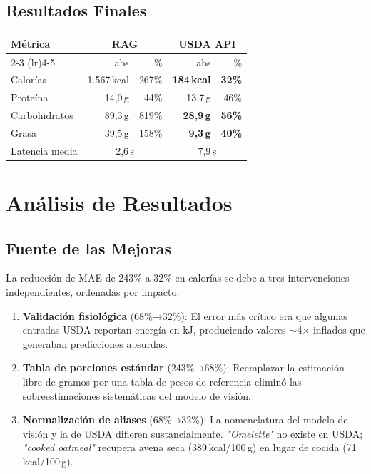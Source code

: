 \documentclass[10pt,a4paper]{article}
\begin{document}
\subsection{Resultados Finales}

\begin{center}
\begin{tabular}{lrrrr}
\toprule
\textbf{Métrica} & \multicolumn{2}{c}{\textbf{RAG}} & \multicolumn{2}{c}{\textbf{USDA API}} \\
\cmidrule(lr){2-3} \cmidrule(lr){4-5}
 & abs & \% & abs & \% \\
\midrule
Calorías   & 1.567\,kcal & 267\% & \textbf{184\,kcal} & \textbf{32\%} \\
Proteína   & 14,0\,g     &  44\% & 13,7\,g            &  46\% \\
Carbohidratos & 89,3\,g  & 819\% & \textbf{28,9\,g}   & \textbf{56\%} \\
Grasa      & 39,5\,g     & 158\% & \textbf{9,3\,g}    & \textbf{40\%} \\
\midrule
Latencia media & \multicolumn{2}{c}{2,6\,s} & \multicolumn{2}{c}{7,9\,s} \\
\bottomrule
\end{tabular}
\end{center}

\section{Análisis de Resultados}

\subsection{Fuente de las Mejoras}

La reducción de MAE de 243\% a 32\% en calorías se debe a tres intervenciones independientes,
ordenadas por impacto:

\begin{enumerate}[noitemsep, topsep=2pt]
  \item \textbf{Validación fisiológica} (68\%→32\%): El error más crítico era que algunas entradas
        USDA reportan energía en kJ, produciendo valores $\sim$4× inflados que generaban predicciones
        absurdas.
  \item \textbf{Tabla de porciones estándar} (243\%→68\%): Reemplazar la estimación libre de gramos
        por una tabla de pesos de referencia eliminó las sobreestimaciones sistemáticas del modelo de
        visión.
  \item \textbf{Normalización de aliases} (68\%→32\%): La nomenclatura del modelo de visión y la de
        USDA difieren sustancialmente. \textit{"Omelette"} no existe en USDA; \textit{"cooked oatmeal"}
        recupera avena seca (389\,kcal/100\,g) en lugar de cocida (71\,kcal/100\,g).
\end{enumerate}
\end{document}
